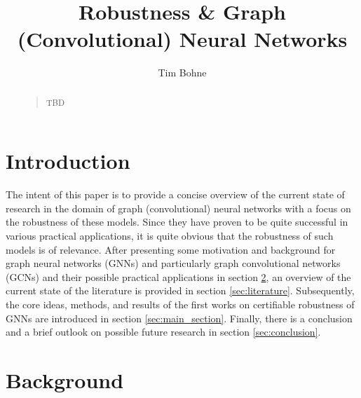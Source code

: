 \documentclass[a4paper,preprint]{sig-alternate}
\begin{document}
\title{Robustness \& Graph (Convolutional) Neural Networks}

%
\author{
%
\alignauthor Tim Bohne\\
}

\maketitle


\begin{abstract}
\begin{quote}
TBD
\end{quote}
\end{abstract}

\section{Introduction}

The intent of this paper is to provide a concise overview of the current state of research in the domain of graph (convolutional) neural networks
with a focus on the robustness of these models. Since they have proven to be quite successful in various practical applications, 
it is quite obvious that the robustness of such models is of relevance.
After presenting some motivation and background for graph neural networks (GNNs) and particularly graph convolutional networks (GCNs)
and their possible practical applications in section \ref{sec:background}, an overview of the current state of the literature is
provided in section \ref{sec:literature}. Subsequently, the core ideas, methods, and results of the first works on certifiable
robustness of GNNs are introduced in section \ref{sec:main_section}.
Finally, there is a conclusion and a brief outlook on possible future research in section \ref{sec:conclusion}.\newline

\section{Background}
\label{sec:background}
\end{document}
